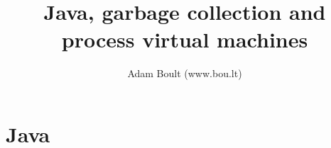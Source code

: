 \documentclass[oneside]{book}
\begin{document}
\author{Adam Boult (www.bou.lt)}
\title{Java, garbage collection and process virtual machines}
\maketitle

\setcounter{tocdepth}{0}
\tableofcontents



\part{Java}

\end{document}
